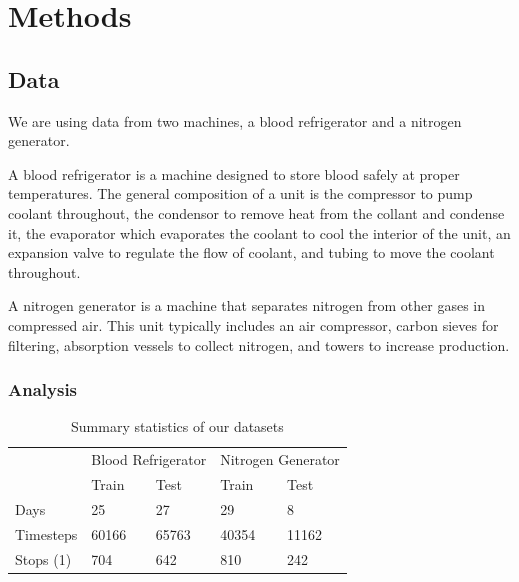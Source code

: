 \documentclass[12pt]{article}
\begin{document}
\section{Methods} \label{meth}
\subsection{Data}

We are using data from two machines, a blood refrigerator and a nitrogen generator\cite{pinciroli_vago_predicting_2024}.

A blood refrigerator is a machine designed to store blood safely at proper temperatures. The general composition of a unit
is the compressor to pump coolant throughout, the condensor to remove heat from the collant and condense it, the
evaporator which evaporates the coolant to cool the interior of the unit, an expansion valve to regulate the flow of
coolant, and tubing to move the coolant throughout.

A nitrogen generator is a machine that separates nitrogen from other gases in compressed air. This unit typically includes an
air compressor, carbon sieves for filtering, absorption vessels to collect nitrogen, and towers to increase production.

\subsubsection{Analysis}

\begin{table}[b]
    \centering
\begin{tabular}{l|ll|ll|}
\cline{2-5}
                                & \multicolumn{2}{l|}{Blood Refrigerator} & \multicolumn{2}{l|}{Nitrogen Generator} \\
                                & Train              & Test               & Train              & Test               \\ \hline
\multicolumn{1}{|l|}{Days}      & 25                 & 27                 & 29                 & 8                  \\
\multicolumn{1}{|l|}{Timesteps} & 60166              & 65763              & 40354              & 11162              \\
\multicolumn{1}{|l|}{Stops (1)} & 704                & 642                & 810                & 242                \\ \hline
\end{tabular}
\caption{Summary statistics of our datasets}
\end{table}
\end{document}
